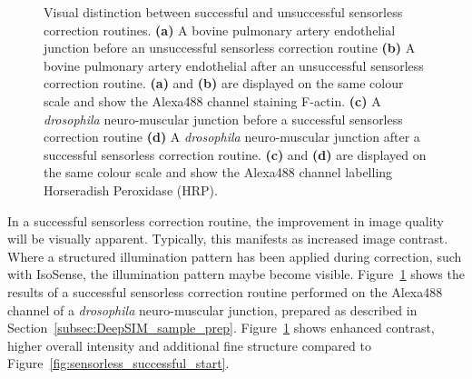 \begin{figure}[h]
\begin{subfigure}{0.48\textwidth}
		\caption{}
		\label{fig:sensorless_successful_end}
	\end{subfigure}
	\caption[Visual distinction between unsuccessful and successful sensorless correction routines]{Visual distinction between successful and unsuccessful sensorless correction routines. \textbf{(a)} A bovine pulmonary artery endothelial junction before an unsuccessful sensorless correction routine \textbf{(b)} A bovine pulmonary artery endothelial after an unsuccessful sensorless correction routine. \textbf{(a)} and \textbf{(b)} are displayed on the same colour scale and show the Alexa488 channel staining F-actin. \textbf{(c)} A \textit{drosophila} neuro-muscular junction before a successful sensorless correction routine \textbf{(d)} A \textit{drosophila} neuro-muscular junction after a successful sensorless correction routine. \textbf{(c)} and \textbf{(d)} are displayed on the same colour scale and show the Alexa488 channel labelling Horseradish Peroxidase (HRP).}
	\label{fig:sensorless_routine_success_failure}
\end{figure}

In a successful sensorless correction routine, the improvement in image 
quality will be visually apparent. Typically, this manifests as increased 
image contrast. Where a structured illumination pattern has been applied 
during correction, such with IsoSense, the illumination pattern maybe become 
visible. Figure~\ref{fig:sensorless_successful_end} shows the results of a 
successful sensorless correction routine performed on the Alexa488 channel of 
a \textit{drosophila} neuro-muscular junction, prepared as described in 
Section~\ref{subsec:DeepSIM_sample_prep}. 
Figure~\ref{fig:sensorless_successful_end} shows enhanced contrast, higher 
overall intensity and additional fine structure compared to 
Figure~\ref{fig:sensorless_successful_start}.